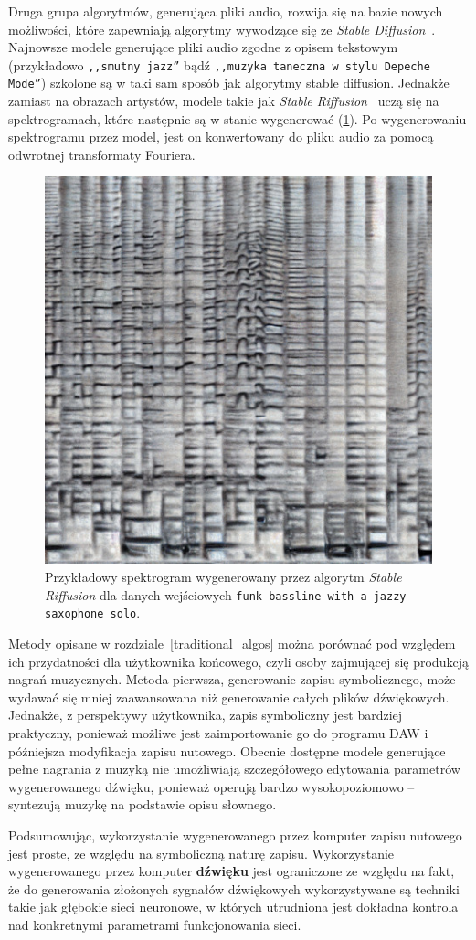Druga grupa algorytmów, generująca pliki audio, rozwija się na bazie nowych możliwości,
które zapewniają algorytmy wywodzące się ze \textit{Stable Diffusion}~\cite{stablediffusion}.
Najnowsze modele generujące pliki audio zgodne z opisem tekstowym 
(przykładowo \texttt{,,smutny jazz''} bądź \texttt{,,muzyka taneczna w stylu Depeche Mode''})
szkolone są w taki sam sposób jak algorytmy stable diffusion. 
Jednakże zamiast na obrazach artystów, modele takie jak \textit{Stable Riffusion}~\cite{riffusion} 
uczą się na spektrogramach, które następnie są w stanie wygenerować (\ref{fig:riffusion_spectro}).
Po wygenerowaniu spektrogramu przez model,
jest on konwertowany do pliku audio za pomocą odwrotnej transformaty Fouriera.

\begin{figure}[H]\label{fig:riffusion_spectro}
    \centering
    \includegraphics[width=0.4\linewidth]{rys01/riffusion_spectro.jpg}
    \caption{Przykładowy spektrogram wygenerowany przez algorytm \textit{Stable Riffusion} dla danych wejściowych \texttt{funk bassline with a jazzy saxophone solo}.}
\end{figure}


Metody opisane w rozdziale~\ref{traditional_algos} można porównać pod względem ich przydatności
dla użytkownika końcowego, czyli osoby zajmującej się produkcją nagrań muzycznych. Metoda pierwsza, 
generowanie zapisu symbolicznego, może wydawać się mniej zaawansowana niż generowanie całych plików dźwiękowych.
Jednakże, z perspektywy użytkownika, zapis symboliczny jest bardziej praktyczny,
ponieważ możliwe jest zaimportowanie go do programu DAW i późniejsza modyfikacja zapisu nutowego.
Obecnie dostępne modele generujące pełne nagrania z muzyką nie umożliwiają
szczegółowego edytowania parametrów wygenerowanego dźwięku, ponieważ operują bardzo wysokopoziomowo 
-- syntezują muzykę na podstawie opisu słownego.

Podsumowując, wykorzystanie wygenerowanego przez komputer zapisu nutowego jest proste, ze względu na symboliczną naturę zapisu.
Wykorzystanie wygenerowanego przez komputer \textbf{dźwięku} jest ograniczone ze względu na fakt, że do generowania złożonych sygnałów dźwiękowych wykorzystywane są techniki takie jak głębokie sieci neuronowe, w których utrudniona jest dokładna kontrola nad konkretnymi parametrami funkcjonowania sieci.


